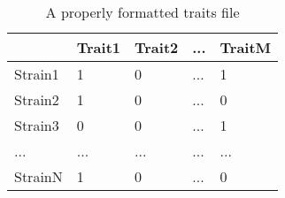 \begin{longtable}{| X | X | X | X | X |}
  \caption{A properly formatted traits file}\label{tab:traits} \\
  \toprule
  & Trait1 & Trait2 & ... & TraitM \\
  \midrule
  Strain1 & 1 & 0 & ... & 1 \\
  Strain2 & 1 & 0 & ... & 0 \\
  Strain3 & 0 & 0 & ... & 1 \\
  ... & ... & ... & ... & ... \\
  StrainN & 1 & 0 & ... & 0 \\
  \bottomrule
\end{longtable}